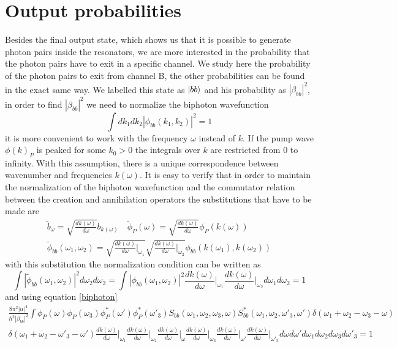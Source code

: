 \section{Output probabilities}
Besides the final output state, which shows us that it is possible to generate photon pairs inside the resonators, we are more interested in the probability that the photon pairs have to exit in a specific channel. We study here the probability of the photon pairs to exit from channel B, the other probabilities can be found in the exact same way. We labelled this state as $\ket{bb}$ and his probability as $|\beta_{bb}|^2$, in order to find $|\beta_{bb}|^2$ we need to normalize the biphoton wavefunction
\begin{equation}\int dk_1 dk_2 |\phi_{bb}(k_1,k_2)|^2 = 1 \end{equation}
it is more convenient to work with the frequency $\omega$ instead of $k$. If the pump wave $\phi(k)_P$ is peaked for some $k_0>0$ the integrals over $k$ are restricted from 0 to infinity. With this assumption, there is a unique correspondence between wavenumber and frequencies $k(\omega)$. It is easy to verify that in order to maintain the normalization of the biphoton wavefunction and the commutator relation between the creation and annihilation operators the substitutions that have to be made are
\begin{multline}\widetilde{b}_\omega = \sqrt{\frac{dk(\omega)}{d\omega}}b_{k(\omega)} \quad \widetilde{\phi}_P(\omega) = \sqrt{\frac{dk(\omega)}{d\omega}}\phi_P(k(\omega)) \quad \\ \widetilde{\phi}_{bb}(\omega_1,\omega_2) = \sqrt{\frac{dk(\omega)}{d\omega}\Bigg|_{\omega_1}}\sqrt{\frac{dk(\omega)}{d\omega}\Bigg|_{\omega_2}}\phi_{bb}(k(\omega_1),k(\omega_2)) \end{multline}
with this substitution the normalization condition can be written as
\begin{equation}\int |\widetilde{\phi}_{bb}(\omega_1,\omega_2)|^2d\omega_2d\omega_2 = \int |\phi_{bb}(\omega_1,\omega_2)|^2\frac{dk(\omega)}{d\omega}\Bigg|_{\omega_1}\frac{dk(\omega)}{d\omega}\Bigg|_{\omega_2} d\omega_1d\omega_2 = 1\end{equation}
and using equation \eqref{biphoton}
\begin{multline}\frac{8\pi^2|\alpha|^4}{\hbar^2|\beta_{bb}|^2}\int \phi_P(\omega)\phi_P(\omega_3)\phi_P^*(\omega')\phi^*_P(\omega'_{3})S_{bb}(\omega_1,\omega_2,\omega_3,\omega)S^*_{bb}(\omega_1,\omega_2,\omega'_3,\omega')\delta(\omega_1+\omega_2-\omega_{3}-\omega)\\
\delta(\omega_1+\omega_2-\omega'_{3}-\omega')\frac{dk(\omega)}{d\omega}\Bigg|_{\omega_1}\frac{dk(\omega)}{d\omega}\Bigg|_{\omega_2}\frac{dk(\omega)}{d\omega}\Bigg|_{\omega}\frac{dk(\omega)}{d\omega}\Bigg|_{\omega_3}\frac{dk(\omega)}{d\omega}\Bigg|_{\omega'}\frac{dk(\omega)}{d\omega}\Bigg|_{\omega'_3} d\omega d\omega'  d\omega_1d\omega_2d\omega_3 d\omega'_3= 1 \end{multline}
